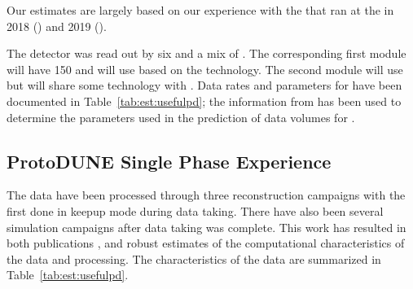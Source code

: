 \documentclass[../main-v1.tex]{subfiles}
\begin{document}
Our estimates  are largely based on our experience with the  %
 that ran at the  in 2018 () and 2019 (). 

The   detector was read out by six  and a mix of . The corresponding first  module will have 150  and will use   based on the  technology. The second  module will use  but will share some technology with  . Data rates and parameters for  have been documented in  Table~\ref{tab:est:usefulpd}; the information from has been used to determine the parameters used in the prediction of data volumes for .

\subsection{ProtoDUNE Single Phase Experience}

The  data have been processed through three reconstruction campaigns with the first done in keepup mode 
during data taking.  There have also been several  simulation campaigns after data taking was complete.  This work has resulted in both publications \cite{DUNE:2021hwx,DUNE:2020fgq,DUNE:2020cqd,DUNE:2020vmp}, and robust estimates of the computational characteristics of the data and processing. The characteristics of the  data are summarized in Table~\ref{tab:est:usefulpd}.
\end{document}
